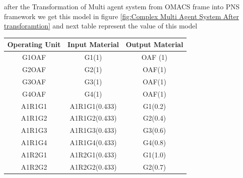 after the Transformation of Multi agent system from OMACS frame into PNS framework we get this model in figure \ref{fig:Complex Multi Agent System After transforamtion} 
and next table represent the value of this model 


\begin{table}[h!]
\centering
\begin{tabular}{@{}ccc@{}}
\toprule
\textbf{Operating Unit} & \textbf{Input Material} & \textbf{Output Material}                                                                              \\ \midrule
G1OAF                   & G1(1)                   & OAF (1)                                                                                               \\
G2OAF                   & G2(1)                   & OAF(1)                                                                                                \\
G3OAF                   & G3(1)                   & OAF(1)                                                                                                \\
G4OAF                   & G4(1)                   & OAF(1)                                                                                                \\ \midrule
A1R1G1                  & A1R1G1(0.433)           & G1(0.2)                                                                                               \\
A1R1G2                  & A1R1G2(0.433)           & G2(0.4)                                                                                               \\
A1R1G3                  & A1R1G3(0.433)           & G3(0.6)                                                                                               \\
A1R1G4                  & A1R1G4(0.433)           & G4(0.8)                                                                                               \\
A1R2G1                  & A1R2G1(0.433)           & G1(1.0)                                                                                               \\
A1R2G2                  & A1R2G2(0.433)           & G2(0.7)                                                                                               \\

\end{tabular}
\end{table}
